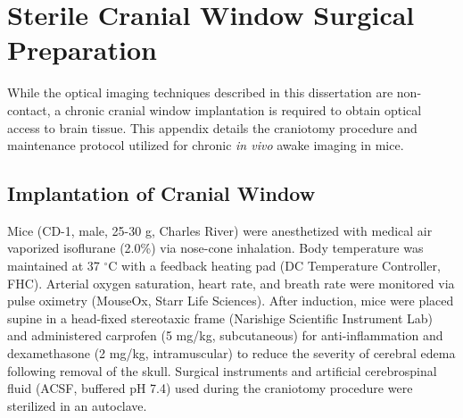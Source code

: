
\chapter{Sterile Cranial Window Surgical Preparation}

While the optical imaging techniques described in this dissertation are non-contact, a chronic cranial window implantation is required to obtain optical access to brain tissue. This appendix details the craniotomy procedure and maintenance protocol utilized for chronic \textit{in vivo} awake imaging in mice.


\section{Implantation of Cranial Window}

Mice (CD-1, male, 25-30 g, Charles River) were anesthetized with medical air vaporized isoflurane (2.0\%) via nose-cone inhalation. Body temperature was maintained at 37 $^\circ$C with a feedback heating pad (DC Temperature Controller, FHC). Arterial oxygen saturation, heart rate, and breath rate were monitored via pulse oximetry (MouseOx, Starr Life Sciences). After induction, mice were placed supine in a head-fixed stereotaxic frame (Narishige Scientific Instrument Lab) and administered carprofen (5 mg/kg, subcutaneous) for anti-inflammation and dexamethasone (2 mg/kg, intramuscular) to reduce the severity of cerebral edema following removal of the skull. Surgical instruments and artificial cerebrospinal fluid (ACSF, buffered pH 7.4) used during the craniotomy procedure were sterilized in an autoclave.

